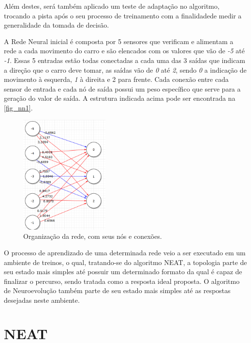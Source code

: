 Além destes, ser{\'a} tamb{\'e}m aplicado um teste de adapta{\c c}{\~a}o no
algoritmo, trocando a pista após o seu processo de treinamento com a finalidadede medir a
generalidade da tomada de decis{\~a}o.

A Rede Neural inicial é composta por 5 sensores que verificam e alimentam a
rede a cada movimento do carro e são elencados com os valores que vão de \textit{-5} até
\textit{-1}. Essas 5 entradas estão todas conectadas a cada uma das 3 saídas que indicam
a direção que o carro deve tomar, as saídas vão de \textit{0} até \textit{2}, sendo \textit{0} a indicação
de movimento à esquerda, \textit{1} à direita e 2 para frente. Cada conexão entre cada
sensor de entrada e cada nó de saída possui um peso específico que serve para a
geração do valor de saída. A estrutura indicada acima pode ser encontrada na
\autoref{fig_nn1}.

\begin{figure}[htb]
        \centering
        \caption{\label{fig_nn1}Organização da rede, com seus nós e conexões.}
        \includegraphics[width=0.4\textwidth]{images/nn1.png}
\end{figure}

O processo de aprendizado de uma determinada rede veio a ser executado em um
ambiente de treinos, o qual, tratando-se do algoritmo NEAT, a topologia parte
de seu estado mais simples até possuir um determinado formato da qual é capaz
de finalizar o percurso, sendo tratada como a resposta ideal proposta. O
algoritmo de Neuroevolução também parte de seu estado mais simples até as
respostas desejadas neste ambiente.

\section{NEAT}

